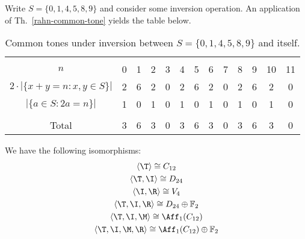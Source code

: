 \begin{example}
    \label{rahn-example}
    \cite[11]{Rahn1975}
    Write $S = \{ 0, 1, 4, 5, 8, 9 \}$ and consider some inversion operation. An application of Th.~\ref{rahn-common-tone} yields the table below.
    \begin{table}[htbp]
    \caption[Rahn's Common Tones Under Inversion]{Common tones under inversion between $S = \{ 0, 1, 4, 5, 8, 9 \}$ and itself.}
    \centering
    \vspace{12pt}
    \begin{tabular}{ c | *{12}{c} }
        \hline\\
        $n$ & 0 & 1 & 2 & 3 & 4 & 5 & 6 & 7 & 8 & 9 & 10 & 11 \\
        $2 \cdot |\{x + y = n : x, y \in S\}|$ & 2 & 6 & 2 & 0 & 2 & 6 & 2 & 0 & 2 & 6 & 2 & 0 \\
        $|\{a \in S : 2a = n\}|$ & 1 & 0 & 1 & 0 & 1 & 0 & 1 & 0 & 1 & 0 & 1 & 0 \\
        \hline\\
        Total & 3 & 6 & 3 & 0 & 3 & 6 & 3 & 0 & 3 & 6 & 3 & 0 \\
        \hline
    \end{tabular}
    \end{table}
\end{example}

\begin{proposition}
	\cite[127]{FripertingerLackner2015}
	We have the following isomorphisms:
	\begin{gather}
		\langle \T \rangle \cong C_{12} \\
		\langle \T, \I \rangle \cong D_{24} \\
		\langle \I, \R \rangle \cong V_4 \\
		\langle \T, \I, \R \rangle \cong D_{24} \oplus \mathbb{F}_2 \\
		\langle \T, \I, \M \rangle \cong \Aff_1(C_{12}) \\
		\langle \T, \I, \M, \R \rangle \cong \Aff_1(C_{12}) \oplus \mathbb{F}_2
	\end{gather}
\end{proposition}

